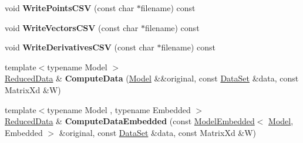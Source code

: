 \begin{DoxyCompactItemize}
\item 
\hypertarget{struct_d_r_d_s_p_1_1_reduced_data_a79e492ae200fb5da34340f410e158354}{void {\bfseries Write\-Points\-C\-S\-V} (const char $\ast$filename) const }\label{struct_d_r_d_s_p_1_1_reduced_data_a79e492ae200fb5da34340f410e158354}

\item 
\hypertarget{struct_d_r_d_s_p_1_1_reduced_data_a972703812e0d0194e5287966a74df79f}{void {\bfseries Write\-Vectors\-C\-S\-V} (const char $\ast$filename) const }\label{struct_d_r_d_s_p_1_1_reduced_data_a972703812e0d0194e5287966a74df79f}

\item 
\hypertarget{struct_d_r_d_s_p_1_1_reduced_data_a61c076aa29224975dbcc51b5f99f362e}{void {\bfseries Write\-Derivatives\-C\-S\-V} (const char $\ast$filename) const }\label{struct_d_r_d_s_p_1_1_reduced_data_a61c076aa29224975dbcc51b5f99f362e}

\item 
\hypertarget{struct_d_r_d_s_p_1_1_reduced_data_a1444567077495f5d80ed3c440134dfe7}{{\footnotesize template$<$typename Model $>$ }\\\hyperlink{struct_d_r_d_s_p_1_1_reduced_data}{Reduced\-Data} \& {\bfseries Compute\-Data} (\hyperlink{struct_d_r_d_s_p_1_1_model}{Model} \&\&original, const \hyperlink{struct_d_r_d_s_p_1_1_data_set}{Data\-Set} \&data, const Matrix\-Xd \&W)}\label{struct_d_r_d_s_p_1_1_reduced_data_a1444567077495f5d80ed3c440134dfe7}

\item 
\hypertarget{struct_d_r_d_s_p_1_1_reduced_data_a1bd28c977de1294d9303687080eb4df8}{{\footnotesize template$<$typename Model , typename Embedded $>$ }\\\hyperlink{struct_d_r_d_s_p_1_1_reduced_data}{Reduced\-Data} \& {\bfseries Compute\-Data\-Embedded} (const \hyperlink{struct_d_r_d_s_p_1_1_model_embedded}{Model\-Embedded}$<$ \hyperlink{struct_d_r_d_s_p_1_1_model}{Model}, Embedded $>$ \&original, const \hyperlink{struct_d_r_d_s_p_1_1_data_set}{Data\-Set} \&data, const Matrix\-Xd \&W)}\label{struct_d_r_d_s_p_1_1_reduced_data_a1bd28c977de1294d9303687080eb4df8}

\end{DoxyCompactItemize}
